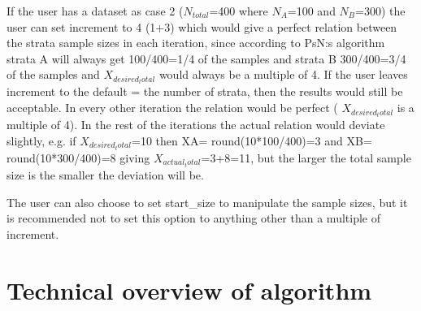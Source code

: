 If the user has a dataset as case 2 ($N_{total}$=400 where $N_A$=100 and $N_B$=300) the user can set increment to 4 (1+3) which would give a perfect relation between the strata sample sizes in each iteration, since according to PsN:s algorithm strata A will always get 100/400=1/4 of the samples and strata B 300/400=3/4 of the samples and $X_{desired_total}$ would always be a multiple of 4. If the user leaves increment to the default = the number of strata, then the results would still be acceptable. In every other iteration the relation would be perfect ( $X_{desired_total}$ is a multiple of 4). In the rest of the iterations the actual relation would deviate slightly, e.g. if $X_{desired_total}$=10 then XA= round(10*100/400)=3 and XB= round(10*300/400)=8 giving $X_{actual_total}$=3+8=11, but the larger the total sample size is the smaller the deviation will be. 

The user can also choose to set start\_size to manipulate the sample sizes, but it is recommended not to set this option to anything other than a multiple of increment.

\section{Technical overview of algorithm}

